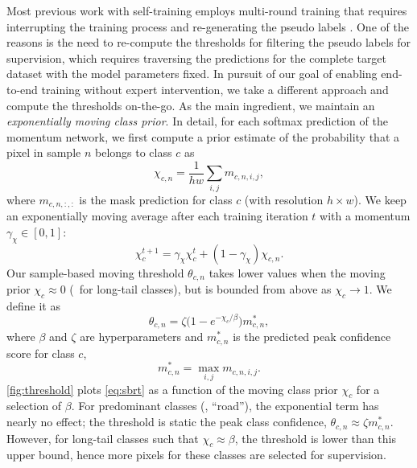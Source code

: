 Most previous work with self-training employs multi-round training that requires interrupting the training process and re-generating the pseudo labels \cite{Li_2020_ECCV,LiYV19,Mei_2020_ECCV,subhani2020learning,ZouYKW18}.
One of the reasons is the need to re-compute the thresholds for filtering the pseudo labels for supervision, which requires traversing the predictions for the complete target dataset with the model parameters fixed.
In pursuit of our goal of enabling end-to-end training without expert intervention, we take a different approach and compute the thresholds on-the-go.
As the main ingredient, we maintain an \emph{exponentially moving class prior}.
In detail, for each softmax prediction of the momentum network, we first compute a prior estimate of the probability that a pixel in sample $n$ belongs to class $c$ as
\begin{equation}
\chi_{c,n} = \frac{1}{h w} \sum_{i,j} m_{c,n,i,j},
\label{eq:prior}
\end{equation}
where $m_{c,n,:,:}$ is the mask prediction for class $c$ (with resolution $h \times w$).
We keep an exponentially moving average after each training iteration $t$ with a momentum $\gamma_\chi \in [0, 1]$:
\begin{equation}
\chi_c^{t+1} = \gamma_\chi \chi^t_c + (1 - \gamma_\chi) \chi_{c,n}.
\end{equation}
Our sample-based moving threshold $\theta_{c,n}$ takes lower values when the moving prior $\chi_c \approx 0$ (\ie~for long-tail classes), but is bounded from above as $\chi_c \rightarrow 1$.
We define it as
\begin{equation}
\theta_{c,n} = \zeta \big(1 - e^{-\chi_c / \beta}\big) m^\ast_{c,n},
\label{eq:sbrt}
\end{equation}
where $\beta$ and $\zeta$ are hyperparameters and $m^\ast_{c,n}$ is the predicted peak confidence score for class $c$, \ie
\begin{equation}
m^\ast_{c,n} = \max_{i,j} m_{c,n,i,j}.
\label{eq:peak-class-confidence}
\end{equation}
\cref{fig:threshold} plots \cref{eq:sbrt} as a function of the moving class prior $\chi_c$ for a selection of $\beta$.
For predominant classes (\eg, ``road''), the exponential term has nearly no effect; the threshold is static \wrt the peak class confidence, \ie $\theta_{c,n} \approx \zeta m^\ast_{c,n}$.
However, for long-tail classes such that $\chi_c \approx \beta$, the threshold is lower than this upper bound, hence more pixels for these classes are selected for supervision.
